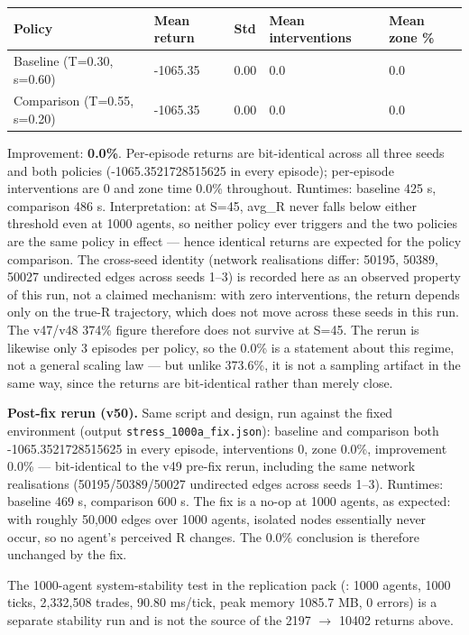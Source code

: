 \documentclass[11pt]{article}
\begin{document}
\begin{table}[htbp]
\centering
\begin{tabular}{lllll}
\toprule
\textbf{Policy} & \textbf{Mean return} & \textbf{Std} & \textbf{Mean interventions} & \textbf{Mean zone \%} \\
\midrule
Baseline (T=0.30, s=0.60) & -1065.35 & 0.00 & 0.0 & 0.0 \\
Comparison (T=0.55, s=0.20) & -1065.35 & 0.00 & 0.0 & 0.0 \\
\bottomrule
\end{tabular}
\end{table}

Improvement: \textbf{0.0\%}. Per-episode returns are bit-identical across all three seeds and both policies (-1065.3521728515625 in every episode); per-episode interventions are 0 and zone time 0.0\% throughout. Runtimes: baseline 425 s, comparison 486 s. Interpretation: at S=45, avg\_R never falls below either threshold even at 1000 agents, so neither policy ever triggers and the two policies are the same policy in effect --- hence identical returns are expected for the policy comparison. The cross-seed identity (network realisations differ: 50195, 50389, 50027 undirected edges across seeds 1--3) is recorded here as an observed property of this run, not a claimed mechanism: with zero interventions, the return depends only on the true-R trajectory, which does not move across these seeds in this run. The v47/v48 374\% figure therefore does not survive at S=45. The rerun is likewise only 3 episodes per policy, so the 0.0\% is a statement about this regime, not a general scaling law --- but unlike 373.6\%, it is not a sampling artifact in the same way, since the returns are bit-identical rather than merely close.

\textbf{Post-fix rerun (v50).} Same script and design, run against the fixed environment (output \texttt{stress\_1000a\_fix.json}): baseline and comparison both -1065.3521728515625 in every episode, interventions 0, zone 0.0\%, improvement 0.0\% --- bit-identical to the v49 pre-fix rerun, including the same network realisations (50195/50389/50027 undirected edges across seeds 1--3). Runtimes: baseline 469 s, comparison 600 s. The fix is a no-op at 1000 agents, as expected: with roughly 50,000 edges over 1000 agents, isolated nodes essentially never occur, so no agent's perceived R changes. The 0.0\% conclusion is therefore unchanged by the fix.

The 1000-agent system-stability test in the replication pack (: 1000 agents, 1000 ticks, 2,332,508 trades, 90.80 ms/tick, peak memory 1085.7 MB, 0 errors) is a separate stability run and is not the source of the 2197 $\rightarrow$ 10402 returns above.
\end{document}
